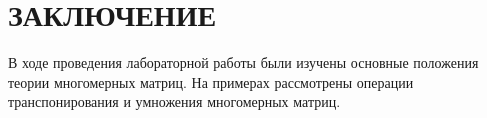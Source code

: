 \section*{ЗАКЛЮЧЕНИЕ}

В ходе проведения лабораторной работы были изучены основные
положения теории многомерных матриц. На примерах рассмотрены
операции транспонирования и умножения многомерных матриц.

\newpage
